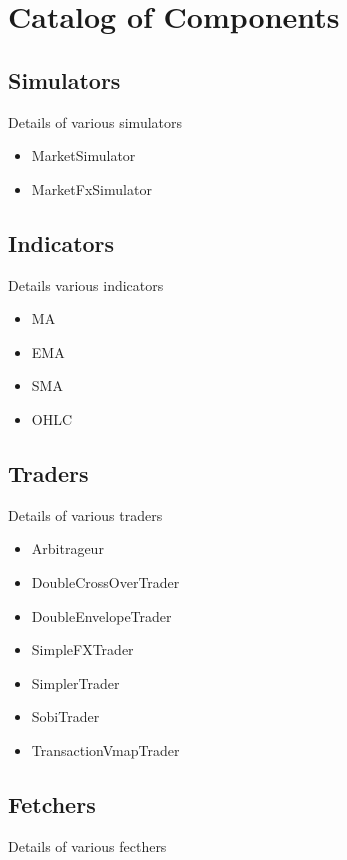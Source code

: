\section{Catalog of Components}

\subsection{Simulators}

Details of various simulators

\begin{itemize}
\item MarketSimulator
\item MarketFxSimulator
\end{itemize}

\subsection{Indicators}

Details various indicators

\begin{itemize}
\item MA
\item EMA
\item SMA
\item OHLC
\end{itemize}

\subsection{Traders}

Details of various traders

\begin{itemize}
\item Arbitrageur
\item DoubleCrossOverTrader
\item DoubleEnvelopeTrader
\item SimpleFXTrader
\item SimplerTrader
\item SobiTrader
\item TransactionVmapTrader
\end{itemize}

\subsection{Fetchers}

Details of various fecthers

